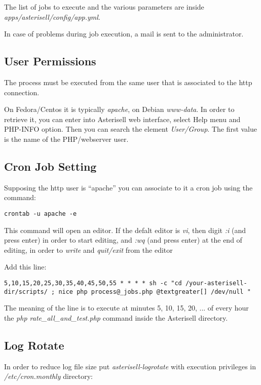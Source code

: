 \documentclass[letterpaper,10pt,english]{sphinxmanual}
\begin{document}
The list of jobs to execute and the various parameters are inside \emph{apps/asterisell/config/app.yml}.

In case of problems during job execution, a mail is sent to the administrator.


\subsection{User Permissions}
\label{index:user-permissions}
The process must be executed from the same user that is associated to the http connection.

On Fedora/Centos it is typically \emph{apache}, on Debian \emph{www-data}. In order to retrieve it, you can enter into Asterisell web interface, select Help menu and PHP-INFO option. Then you can search the element \emph{User/Group}. The first value is the name of the PHP/webserver user.


\subsection{Cron Job Setting}
\label{index:cron-job-setting}
Supposing the http user is ``apache'' you can associate to it a cron job using the command:

\begin{Verbatim}[commandchars=@\[\]]
crontab -u apache -e
\end{Verbatim}

This command will open an editor. If the defalt editor is \emph{vi}, then digit \emph{:i} (and press enter) in order to start editing, and \emph{:wq} (and press enter) at the end of editing, in order to \emph{write} and \emph{quit/exit} from the editor

Add this line:

\begin{Verbatim}[commandchars=@\[\]]
5,10,15,20,25,30,35,40,45,50,55 * * * * sh -c "cd /your-asterisell-dir/scripts/ ; nice php process@_jobs.php @textgreater[] /dev/null "
\end{Verbatim}

The meaning of the line is to execute at minutes 5, 10, 15, 20, ... of every hour the \emph{php rate\_all\_and\_test.php} command inside the Asterisell directory.


\subsection{Log Rotate}
\label{index:log-rotate}
In order to reduce log file size put \emph{asterisell-logrotate} with execution privileges in \emph{/etc/cron.monthly} directory:
\end{document}
